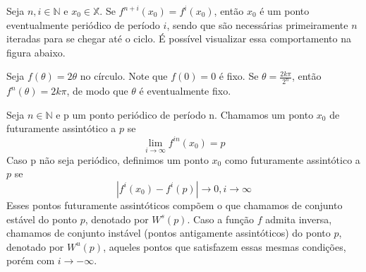 \documentclass[../IC.tex]{subfiles}
\begin{document}
	\begin{definicao}
		Seja $n, i \in \mathbb{N}$ e $x_0 \in \mathbb{X}$. Se $f^{n+i}(x_0) = f^i(x_0)$, então $x_0$ é um ponto eventualmente periódico de período $i$, sendo que são necessárias primeiramente $n$ iteradas para se chegar até o ciclo. É possível visualizar essa comportamento na figura abaixo.
		\begin{center}
		\end{center}
	\end{definicao}
	\begin{exemplo}
		Seja $f(\theta) = 2\theta$ no círculo. Note que $f(0) = 0$ é fixo. Se $\theta = \frac{2k\pi}{2^n}$, então $f^n(\theta) = 2k\pi$, de modo que $\theta$ é eventualmente fixo.
	\end{exemplo}
	\begin{definicao}
		Seja $n \in \mathbb{N}$ e p um ponto periódico de período n. Chamamos um ponto $x_0$ de futuramente assintótico a $p$ se $$\lim_{i \rightarrow \infty} f^{in}(x_0) = p$$
		Caso p não seja periódico, definimos um ponto $x_0$ como futuramente assintótico a $p$ se $$|f^i(x_0) - f^i(p)| \rightarrow 0, i \rightarrow \infty$$
		Esses pontos futuramente assintóticos compõem o que chamamos de conjunto estável do ponto $p$, denotado por $W^s(p)$. Caso a função $f$ admita inversa, chamamos de conjunto instável (pontos antigamente assintóticos) do ponto $p$, denotado por $W^u(p)$, aqueles pontos que satisfazem essas mesmas condições, porém com $i \rightarrow -\infty$.
	\end{definicao}
\end{document}
